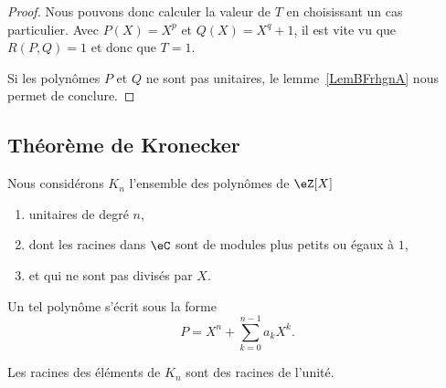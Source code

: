 \begin{proof}
    Nous pouvons donc calculer la valeur de \( T\) en choisissant un cas particulier. Avec \( P(X)=X^p\) et \( Q(X)=X^q+1\), il est vite vu que \( R(P,Q)=1\) et donc que \( T=1\).

    Si les polynômes \( P\) et \( Q\) ne sont pas unitaires, le lemme~\ref{LemBFrhgnA} nous permet de conclure.

\end{proof}


\subsection{Théorème de Kronecker}

Nous considérons \( K_n\) l'ensemble des polynômes de \( \eZ[X]\)
\begin{enumerate}
    \item
        unitaires de degré \( n\),
    \item
        dont les racines dans \( \eC\) sont de modules plus petits ou égaux à \( 1\),
    \item
        et qui ne sont pas divisés par \( X\).
\end{enumerate}
Un tel polynôme s'écrit sous la forme
\begin{equation}
    P=X^n+\sum_{k=0}^{n-1}a_kX^k.
\end{equation}

\begin{theorem}    \label{ThoOWMNAVp}
    Les racines des éléments de \( K_n\) sont des racines de l'unité.
\end{theorem}

